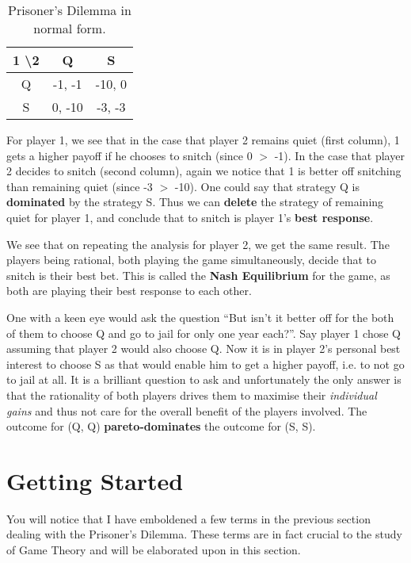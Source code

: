 \documentclass[11pt]{article}
\theoremstyle{definition}
\begin{document}
\begin{table}[h!]
\centering
\begin{tabular}{|c|c|c|}
\hline
1 \textbackslash 2 & Q & S \\
\hline
Q & -1, -1 & -10, 0 \\
\hline
S & 0, -10 & -3, -3 \\
\hline
\end{tabular}
\caption{Prisoner's Dilemma in normal form.}
\label{table:pd}
\end{table}

For player 1, we see that in the case that player 2 remains quiet (first column), 1 gets a higher payoff if he chooses to snitch (since 0 $>$ -1). In the case that player 2 decides to snitch (second column), again we notice that 1 is better off snitching than remaining quiet (since -3 $>$ -10). One could say that strategy Q is \textbf{dominated} by the strategy S. Thus we can \textbf{delete} the strategy of remaining quiet for player 1, and conclude that to snitch is player 1’s \textbf{best response}.

	We see that on repeating the analysis for player 2, we get the same result. The players being rational, both playing the game simultaneously, decide that to snitch is their best bet. This is called the \textbf{Nash Equilibrium} for the game, as both are playing their best response to each other.
	
	One with a keen eye would ask the question “But isn’t it better off for the both of them to choose Q and go to jail for only one year each?”. Say player 1 chose Q assuming that player 2 would also choose Q. Now it is in player 2’s personal best interest to choose S as that would enable him to get a higher payoff, i.e. to not go to jail at all. It is a brilliant question to ask and unfortunately the only answer is that the rationality of both players drives them to maximise their \textit{individual gains} and thus not care for the overall benefit of the players involved. The outcome for (Q, Q) \textbf{pareto-dominates} the outcome for (S, S).
	
\newpage

\section{Getting Started}
You will notice that I have emboldened a few terms in the previous section dealing with the Prisoner’s Dilemma. These terms are in fact crucial to the study of Game Theory and will be elaborated upon in this section.
\end{document}
